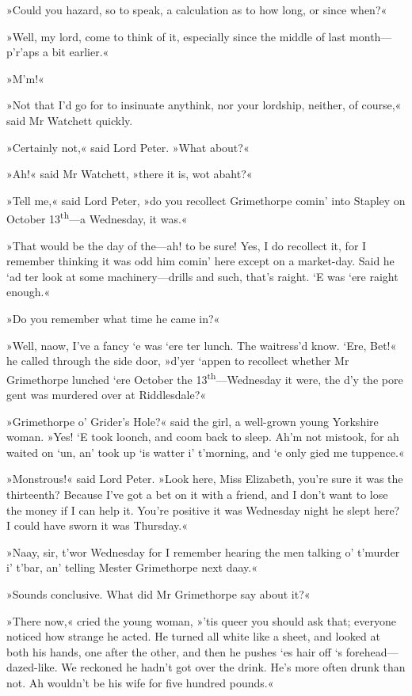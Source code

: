 »Could you hazard, so to speak, a calculation as to how long, or since when?«

»Well, my lord, come to think of it, especially since the middle of last month—p'r'aps a bit earlier.«

»M'm!«

»Not that I'd go for to insinuate anythink, nor your lordship, neither, of course,« said Mr Watchett quickly.

»Certainly not,« said Lord Peter. »What about?«

»Ah!« said Mr Watchett, »there it is, wot abaht?«

»Tell me,« said Lord Peter, »do you recollect Grimethorpe comin' into Stapley on October 13\textsuperscript{th}—a Wednesday, it was.«

»That would be the day of the—ah! to be sure! Yes, I do recollect it, for I remember thinking it was odd him comin' here except on a market-day. Said he `ad ter look at some machinery—drills and such, that's raight. `E was `ere raight enough.«

»Do you remember what time he came in?«

»Well, naow, I've a fancy `e was `ere ter lunch. The waitress'd know. `Ere, Bet!« he called through the side door, »d'yer `appen to recollect whether Mr Grimethorpe lunched `ere October the 13\textsuperscript{th}—Wednesday it were, the d'y the pore gent was murdered over at Riddlesdale?«

»Grimethorpe o' Grider's Hole?« said the girl, a well-grown young Yorkshire woman. »Yes! `E took loonch, and coom back to sleep. Ah'm not mistook, for ah waited on `un, an' took up `is watter i' t'morning, and `e only gied me tuppence.«

»Monstrous!« said Lord Peter. »Look here, Miss Elizabeth, you're sure it was the thirteenth? Because I've got a bet on it with a friend, and I don't want to lose the money if I can help it. You're positive it was Wednesday night he slept here? I could have sworn it was Thursday.«

»Naay, sir, t'wor Wednesday for I remember hearing the men talking o' t'murder i' t'bar, an' telling Mester Grimethorpe next daay.«

»Sounds conclusive. What did Mr Grimethorpe say about it?«

»There now,« cried the young woman, »'tis queer you should ask that; everyone noticed how strange he acted. He turned all white like a sheet, and looked at both his hands, one after the other, and then he pushes `es hair off `s forehead—dazed-like. We reckoned he hadn't got over the drink. He's more often drunk than not. Ah wouldn't be his wife for five hundred pounds.«

